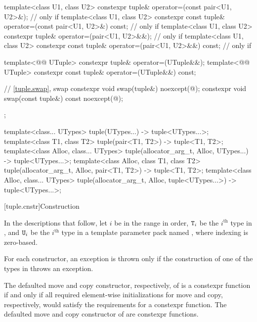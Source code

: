 \begin{codeblock}
{{    template<class U1, class U2>
      constexpr tuple& operator=(const pair<U1, U2>&);          // only if 
    template<class U1, class U2>
      constexpr const tuple& operator=(const pair<U1, U2>&) const;
                                                                // only if 
    template<class U1, class U2>
      constexpr tuple& operator=(pair<U1, U2>&&);               // only if 
    template<class U1, class U2>
      constexpr const tuple& operator=(pair<U1, U2>&&) const;   // only if 

    template<@@ UTuple>
      constexpr tuple& operator=(UTuple&&);
    template<@@ UTuple>
      constexpr const tuple& operator=(UTuple&&) const;

    // \ref{tuple.swap},  swap
    constexpr void swap(tuple&) noexcept(@\seebelow@);
    constexpr void swap(const tuple&) const noexcept(@\seebelow@);
  };

  template<class... UTypes>
    tuple(UTypes...) -> tuple<UTypes...>;
  template<class T1, class T2>
    tuple(pair<T1, T2>) -> tuple<T1, T2>;
  template<class Alloc, class... UTypes>
    tuple(allocator_arg_t, Alloc, UTypes...) -> tuple<UTypes...>;
  template<class Alloc, class T1, class T2>
    tuple(allocator_arg_t, Alloc, pair<T1, T2>) -> tuple<T1, T2>;
  template<class Alloc, class... UTypes>
    tuple(allocator_arg_t, Alloc, tuple<UTypes...>) -> tuple<UTypes...>;
}
\end{codeblock}

[tuple.cnstr]{Construction}

\pnum
In the descriptions that follow, let $i$ be in the range
 in order, $\texttt{T}_i$
be the $i^\text{th}$ type in , and
$\texttt{U}_i$ be the $i^\text{th}$ type in a template parameter pack named , where indexing
is zero-based.

\pnum
For each  constructor, an exception is thrown only if the construction of
one of the types in  throws an exception.

\pnum
The defaulted move and copy constructor, respectively, of
 is a constexpr function if and only if all
required element-wise initializations for move and copy, respectively,
would satisfy the requirements for a constexpr function. The
defaulted move and copy constructor of  are
constexpr functions.

